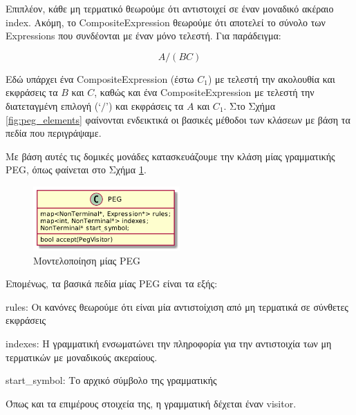 Επιπλέον, κάθε μη τερματικό θεωρούμε ότι αντιστοιχεί σε έναν μοναδικό ακέραιο index. 
Ακόμη, το CompositeExpression θεωρούμε ότι αποτελεί το σύνολο των Expressions που συνδέονται με έναν μόνο τελεστή. 
Για παράδειγμα:

\begin{equation}
	A / (B C)
\end{equation}

Εδώ υπάρχει ένα CompositeExpression (έστω $C_1$) με τελεστή την ακολουθία και εκφράσεις τα $B$ και $C$, καθώς και ένα CompositeExpression με τελεστή την διατεταγμένη επιλογή (`$/$') και εκφράσεις τα $A$ και $C_1$. 
Στο Σχήμα \ref{fig:peg_elements} φαίνονται ενδεικτικά οι βασικές μέθοδοι των κλάσεων με βάση τα πεδία που περιγράψαμε.

Με βάση αυτές τις δομικές μονάδες κατασκευάζουμε την κλάση μίας γραμματικής PEG, όπως φαίνεται στο Σχήμα \ref{fig:peg}.

\begin{figure}[h]
    \centering
	\includegraphics[width=0.50\textwidth]{uml/peg}
	\caption{Μοντελοποίηση μίας PEG}
    \label{fig:peg}
\end{figure}

\begin{minipage}{\textwidth}

Επομένως, τα βασικά πεδία μίας PEG είναι τα εξής:

\begin{description}[font=$\bullet$\scshape\bfseries]
	\item rules: Οι κανόνες θεωρούμε ότι είναι μία αντιστοίχιση από μη τερματικά σε σύνθετες εκφράσεις
	\item indexes: Η γραμματική ενσωματώνει την πληροφορία για την αντιστοιχία των μη τερματικών με μοναδικούς ακεραίους.
	\item start\_symbol: Το αρχικό σύμβολο της γραμματικής
\end{description}

\end{minipage}

\vspace{0.5cm}
Όπως και τα επιμέρους στοιχεία της, η γραμματική δέχεται έναν visitor.

